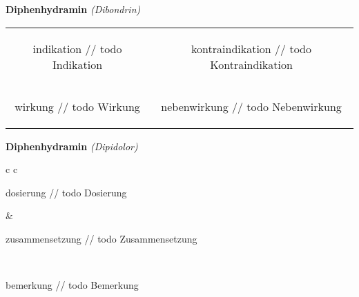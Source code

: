 \documentclass[12pt]{beamer}
\begin{document}
\begin{frame}{
    \textbf{Diphenhydramin}
    \textit{(Dibondrin)}
}
    \begin{tabular}{c c}
        \begin{beamercolorbox}[wd=\boxwidth\textwidth,ht=\boxheight\textheight,sep=1em]{indikation}
        // todo Indikation
        \end{beamercolorbox} & 
        \begin{beamercolorbox}[wd=\boxwidth\textwidth,ht=\boxheight\textheight,sep=1em]{kontraindikation}
        // todo Kontraindikation 
        \end{beamercolorbox} \\
        \begin{beamercolorbox}[wd=\boxwidth\textwidth,ht=\boxheight\textheight,sep=1em]{wirkung}
        // todo Wirkung
        \end{beamercolorbox} & 
        \begin{beamercolorbox}[wd=\boxwidth\textwidth,ht=\boxheight\textheight,sep=1em]{nebenwirkung}
        // todo Nebenwirkung
        \end{beamercolorbox} \\
    \end{tabular}
\end{frame}

\begin{frame}{
    \textbf{Diphenhydramin}
    \textit{(Dipidolor)}
}
    \begin{tabular}{c c}
        \begin{beamercolorbox}[wd=\boxwidth\textwidth,ht=\boxheight\textheight,sep=1em]{dosierung}
        // todo Dosierung
        \end{beamercolorbox} & 
        \begin{beamercolorbox}[wd=\boxwidth\textwidth,ht=\boxheight\textheight,sep=1em]{zusammensetzung}
        // todo Zusammensetzung
        \end{beamercolorbox} \\
        \begin{beamercolorbox}[wd=\textwidth,ht=\boxheight\textheight,sep=1em]{bemerkung}
        // todo Bemerkung
        \end{beamercolorbox} \\
    \end{tabular}
\end{frame}
\end{document}
